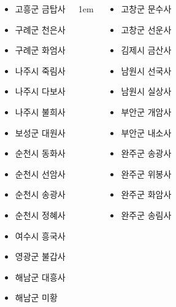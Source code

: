 \documentclass[	20pt, 
							a0paper, 
							landscape,
							margin=0mm, %
							innermargin=10mm,  		%
							blockverticalspace=4mm, %
							colspace=5mm, 
							subcolspace=0mm
							]{tikzposter}
\begin{document}
\begin{columns}
{\begin{LARGE}
\begin{itemize}
					\item 고흥군		금탑사
 
					\item 구례군		천은사
					\item 구례군		화엄사

					\item 나주시		죽림사
					\item 나주시		다보사	
					\item 나주시		불희사


					\item 보성군 	대원사

					\item 순천시		동화사
					\item 순천시		선암사
					\item 순천시		송광사
					\item 순천시		정혜사

					\item 여수시		흥국사
					\item 영광군		불갑사
					\item 해남군 	대흥사	
					\item 해남군		미황

					\end{itemize}
				\end{LARGE}
			} %




			{
					\setlength{\leftmargini}{4em}
					\setlength{\labelsep} {1em}
				\begin{LARGE}
					\begin{itemize}
					\item 고창군		문수사
					\item 고창군		선운사

					\item 김제시		금산사
					\item 남원시		선국사
					\item 남원시		실상사
					\item 부안군		개암사
					\item 부안군		내소사

					\item 완주군		송광사
					\item 완주군		위봉사
					\item 완주군		화암사
					\item 완주군		송림사


\end{itemize}
\end{LARGE}}
\end{columns}
\end{document}
